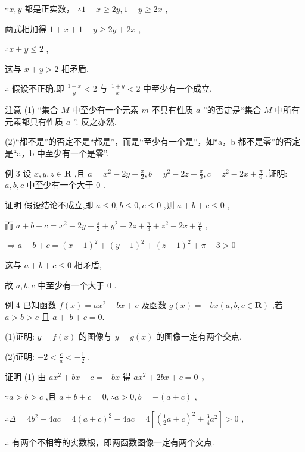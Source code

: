 \documentclass[10pt]{article}
\newcommand*\circled[1]{\tikz[baseline=(char.base)]{\node[shape=circle,draw,inner sep=1.5pt] (char) {\small #1};}}
\begin{document}
\(\because x,y\) 都是正实数， \(\therefore 1 + x \geq  {2y},1 + y \geq  {2x}\) ,

两式相加得 \(1 + x + 1 + y \geq  {2y} + {2x}\) ,

\(\therefore x + y \leq  2\) ,

这与 \(x + y > 2\) 相矛盾.

\(\therefore\) 假设不正确,即 \(\frac{1 + x}{y} < 2\) 与 \(\frac{1 + y}{x} < 2\) 中至少有一个成立.

注意 (1) “集合 \(M\) 中至少有一个元素 \(m\) 不具有性质 \(a\) ”的否定是“集合 \(M\) 中所有元素都具有性质 \(a\) ”. 反之亦然.

(2)“都不是”的否定不是“都是”，而是“至少有一个是”，如“a，b 都不是零”的否定是“a，b 中至少有一个是零”.

例 3 设 \(x,y,z \in  \mathbf{R}\) ,且 \(a = {x}^{2} - {2y} + \frac{\pi }{2},b = {y}^{2} - {2z} + \frac{\pi }{3},c = {z}^{2} - {2x} + \frac{\pi }{6}\) ,证明: \(a,b,c\) 中至少有一个大于 0 .

证明 假设结论不成立,即 \(a \leq  0,b \leq  0,c \leq  0\) ,则 \(a + b + c \leq  0\) ,

而 \(a + b + c = {x}^{2} - {2y} + \frac{\pi }{2} + {y}^{2} - {2z} + \frac{\pi }{3} + {z}^{2} - {2x} + \frac{\pi }{6}\) ,

\(\Rightarrow  a + b + c = {\left( x - 1\right) }^{2} + {\left( y - 1\right) }^{2} + {\left( z - 1\right) }^{2} + \pi  - 3 > 0\)

这与 \(a + b + c \leq  0\) 相矛盾,

故 \(a,b,c\) 中至少有一个大于 0 .

例 4 已知函数 \(f\left( x\right)  = a{x}^{2} + {bx} + c\) 及函数 \(g\left( x\right)  =  - {bx}\left( {a,b,c \in  \mathbf{R}}\right)\) ,若 \(a > b > c\) 且 \(a + \; b + c = 0.\)

(1)证明: \(y = f\left( x\right)\) 的图像与 \(y = g\left( x\right)\) 的图像一定有两个交点.

(2)证明: \(- 2 < \frac{c}{a} <  - \frac{1}{2}\) .

证明 (1) 由 \(a{x}^{2} + {bx} + c =  - {bx}\) 得 \(a{x}^{2} + {2bx} + c = 0\)  \circled{1} ，

\(\because a > b > c\) ,且 \(a + b + c = 0,\therefore a > 0,b =  - \left( {a + c}\right)\) ,

\(\therefore \Delta  = 4{b}^{2} - {4ac} = 4{\left( a + c\right) }^{2} - {4ac} = 4\left\lbrack  {{\left( \frac{1}{2}a + c\right) }^{2} + \frac{3}{4}{a}^{2}}\right\rbrack   > 0\) ,

\(\therefore\)  \circled{1} 有两个不相等的实数根，即两函数图像一定有两个交点.
\end{document}
